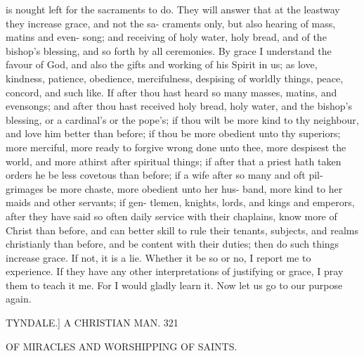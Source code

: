 \documentclass{custom}
\begin{document}
{is nought left for the sacraments to do. They will answer 
that at the leastway they increase grace, and not the sa- 
craments only, but also hearing of mass, matins and even- 
song; and receiving of holy water, holy bread, and of the 
bishop's blessing, and so forth by all ceremonies. By 
grace I understand the favour of God, and also the gifts 
and working of his Spirit in us; as love, kindness, 
patience, obedience, mercifulness, despising of worldly 
things, peace, concord, and such like. If after thou hast 
heard so many masses, matins, and evensongs; and after 
thou hast received holy bread, holy water, and the bishop's 
blessing, or a cardinal's or the pope's; if thou wilt be 
more kind to thy neighbour, and love him better than 
before; if thou be more obedient unto thy superiors; more 
merciful, more ready to forgive wrong done unto thee, 
more despisest the world, and more athirst after spiritual 
things; if after that a priest hath taken orders he be less 
covetous than before; if a wife after so many and oft pil- 
grimages be more chaste, more obedient unto her hus- 
band, more kind to her maids and other servants; if gen- 
tlemen, knights, lords, and kings and emperors, after they 
have said so often daily service with their chaplains, know 
more of Christ than before, and can better skill to rule their 
tenants, subjects, and realms christianly than before, and 
be content with their duties; then do such things increase 
grace. If not, it is a lie. Whether it be so or no, I report 
me to experience. If they have any other interpretations 
of justifying or grace, I pray them to teach it me. For I 
would gladly learn it. Now let us go to our purpose 
again. 


TYNDALE.] A CHRISTIAN MAN. 321

OF MIRACLES AND WORSHIPPING OF SAINTS. 

}
\end{document}
